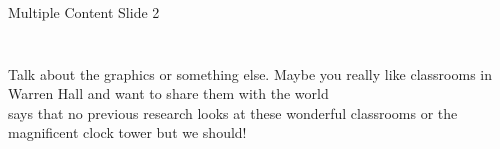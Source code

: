 \documentclass[usenames,dvipsnames]{beamer}
\begin{document}
\begin{frame}{Multiple Content Slide 2}
\begin{columns}
\begin{column}{0.3\textwidth}
\begin{figure}
            \end{figure}       
        \end{column} 
    \end{columns}
    \begin{columns}
        \begin{column}{\textwidth}
            \footnotesize
             Talk about the graphics or something else. Maybe you really like classrooms in Warren Hall and want to share them with the world \citep{Warren_food_1921}\\
            \vspace{10pt}
            \citet{Berry_food_2018} says that no previous research looks at these wonderful classrooms or the magnificent clock tower but we should!
        \end{column}
    \end{columns}
\end{frame}
\end{document}
